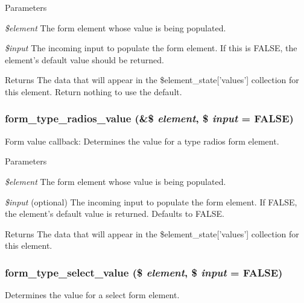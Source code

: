 \begin{DoxyParams}{Parameters}
\item[{\em \$element}]The form element whose value is being populated. \item[{\em \$input}]The incoming input to populate the form element. If this is FALSE, the element's default value should be returned.\end{DoxyParams}
\begin{DoxyReturn}{Returns}
The data that will appear in the \$element\_\-state\mbox{[}'values'\mbox{]} collection for this element. Return nothing to use the default. 
\end{DoxyReturn}
\hypertarget{group__form__api_gaf0ad41f155f7ae8eae8386f3702b56f8}{
\subsubsection[{form\_\-type\_\-radios\_\-value}]{\setlength{\rightskip}{0pt plus 5cm}form\_\-type\_\-radios\_\-value (\&\$ {\em element}, \/  \$ {\em input} = {\ttfamily FALSE})}}
\label{group__form__api_gaf0ad41f155f7ae8eae8386f3702b56f8}
Form value callback: Determines the value for a type radios form element.


\begin{DoxyParams}{Parameters}
\item[{\em \$element}]The form element whose value is being populated. \item[{\em \$input}](optional) The incoming input to populate the form element. If FALSE, the element's default value is returned. Defaults to FALSE.\end{DoxyParams}
\begin{DoxyReturn}{Returns}
The data that will appear in the \$element\_\-state\mbox{[}'values'\mbox{]} collection for this element. 
\end{DoxyReturn}
\hypertarget{group__form__api_ga244474506f87e80bc91f5d1e3be2a35e}{
\subsubsection[{form\_\-type\_\-select\_\-value}]{\setlength{\rightskip}{0pt plus 5cm}form\_\-type\_\-select\_\-value (\$ {\em element}, \/  \$ {\em input} = {\ttfamily FALSE})}}
\label{group__form__api_ga244474506f87e80bc91f5d1e3be2a35e}
Determines the value for a select form element.


